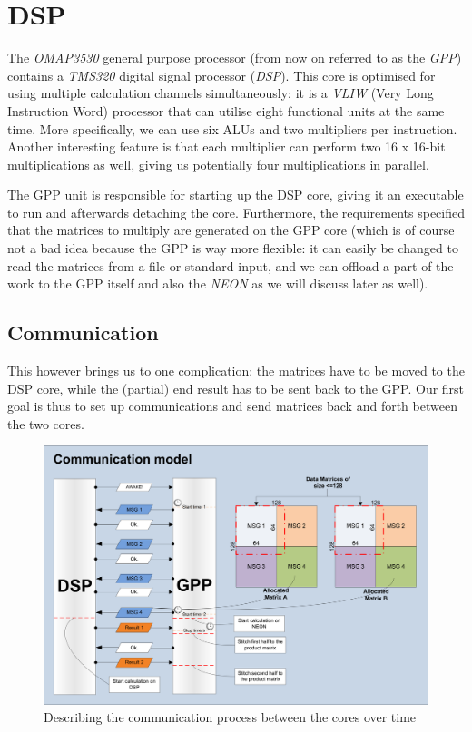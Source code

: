 \section{DSP}
The \emph{OMAP3530} general purpose processor (from now on referred to as the
\emph{GPP}) contains a \emph{TMS320} digital signal processor (\emph{DSP})\cite{gpp-refman}. This
core is optimised for using multiple calculation channels simultaneously: it is
a \emph{VLIW} (Very Long Instruction Word) processor that can utilise eight
functional units at the same time. More specifically, we can use six ALUs and
two multipliers per instruction. Another interesting feature is that each
multiplier can perform two 16 x 16-bit multiplications as well\cite{dsp-refman}, giving us
potentially four multiplications in parallel.

The GPP unit is responsible for starting up the DSP core, giving it an executable to run
and afterwards detaching the core. Furthermore, the requirements specified
that the matrices to multiply are generated on the GPP core (which is
of course not a bad idea because the GPP is way more flexible: it can easily
be changed to read the matrices from a file or standard input, and we can
offload a part of the work to the GPP itself and also the \emph{NEON} as we
will discuss later as well).

\subsection{Communication}
This however brings us to one complication: the matrices have to be moved to
the DSP core, while the (partial) end result has to be sent back to the GPP.
Our first goal is thus to set up communications and send matrices back and forth
between the two cores.

\begin{figure}[h]
\includegraphics[width=\textwidth]{images/gpp_dsp_com}
\caption{Describing the communication process between the cores over time}
\label{fig:gpp_dsp_com}
\end{figure}

